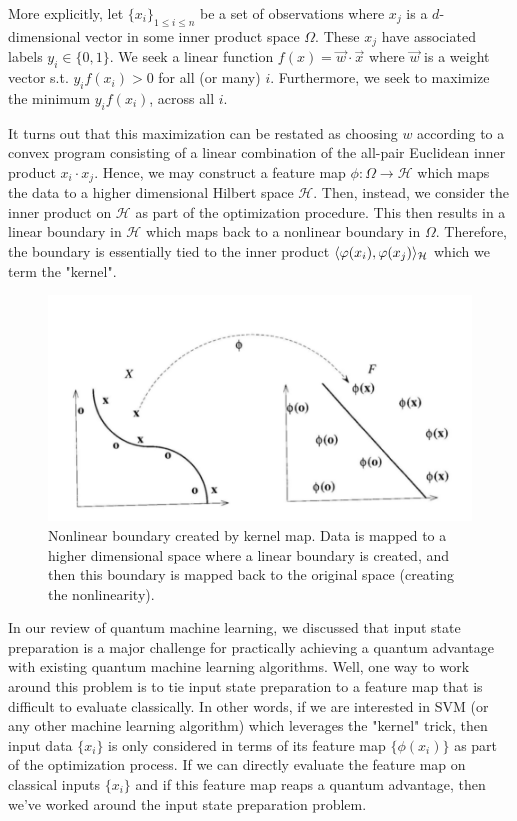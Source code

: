 \documentclass[main.tex]{subfiles}
\begin{document}
More explicitly, let $\{ x_i \}_{1 \leq i \leq n}$ be a set of observations where $x_j$ is a $d$-dimensional vector in some inner product space $\Omega$. These $x_j$ have associated labels $y_i \in \{ 0 , 1\}$. We seek a linear function $f(x) = \vec{w} \cdot \vec{x}$ where $\vec{w}$ is a weight vector s.t. $y_if(x_i) > 0$ for all (or many) $i$. Furthermore, we seek to maximize the minimum $y_i f(x_i)$, across all $i$.

It turns out that this maximization can be restated as choosing $w$ according to a convex program consisting of a linear combination of the all-pair Euclidean inner product $x_i \cdot x_j$. Hence, we may construct a feature map $\phi : \Omega \rightarrow \mathcal{H}$ which maps the data to a higher dimensional Hilbert space $\mathcal{H}$. Then, instead, we consider the inner product on $\mathcal{H}$ as part of the optimization procedure. This then results in a linear boundary in $\mathcal{H}$ which maps back to a nonlinear boundary in $\Omega$. Therefore, the boundary is essentially tied to the inner product $\langle \varphi (x_i), \varphi(x_j) \rangle _{\mathcal{H}}$ which we term the "kernel".

\begin{figure}[H]
\centering
\includegraphics[width= 0.7\linewidth]{images/kernel}
\caption{Nonlinear boundary created by kernel map. Data is mapped to a higher dimensional space where a linear boundary is created, and then this boundary is mapped back to the original space (creating the nonlinearity).}
\end{figure}


In our review of quantum machine learning, we discussed that input state preparation is a major challenge for practically achieving a quantum advantage with existing quantum machine learning algorithms. Well, one way to work around this problem is to tie input state preparation to a feature map that is difficult to evaluate classically. In other words, if we are interested in SVM (or any other machine learning algorithm) which leverages the "kernel" trick, then input data $\{ x_i \}$ is only considered in terms of its feature map $\{ \phi(x_i) \}$ as part of the optimization process. If we can directly evaluate the feature map on classical inputs $\{ x_i \}$ and if this feature map reaps a quantum advantage, then we've worked around the input state preparation problem.
\end{document}
